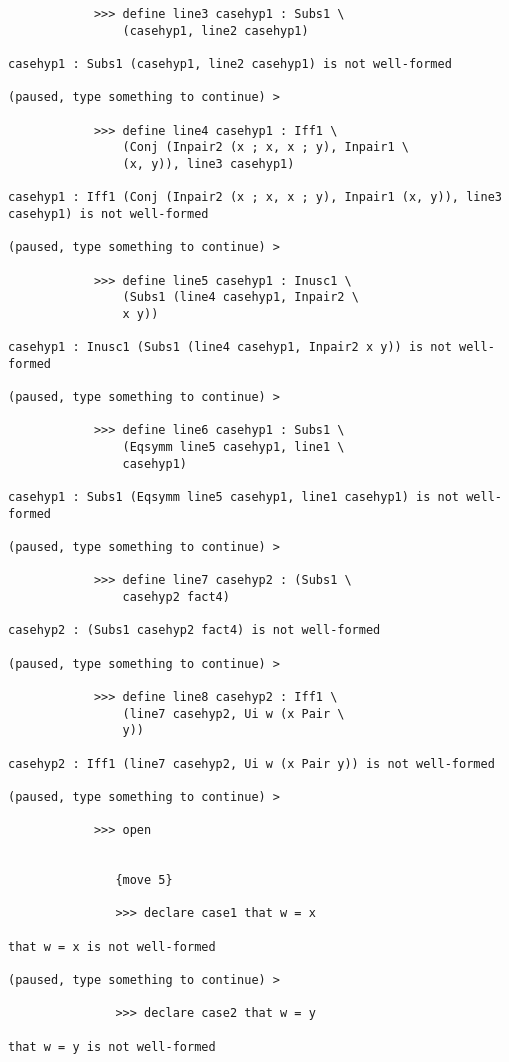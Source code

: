 \documentclass[12pt]{article}
\begin{document}
\begin{verbatim}
            >>> define line3 casehyp1 : Subs1 \
                (casehyp1, line2 casehyp1)

casehyp1 : Subs1 (casehyp1, line2 casehyp1) is not well-formed

(paused, type something to continue) >

            >>> define line4 casehyp1 : Iff1 \
                (Conj (Inpair2 (x ; x, x ; y), Inpair1 \
                (x, y)), line3 casehyp1)

casehyp1 : Iff1 (Conj (Inpair2 (x ; x, x ; y), Inpair1 (x, y)), line3 casehyp1) is not well-formed

(paused, type something to continue) >

            >>> define line5 casehyp1 : Inusc1 \
                (Subs1 (line4 casehyp1, Inpair2 \
                x y))

casehyp1 : Inusc1 (Subs1 (line4 casehyp1, Inpair2 x y)) is not well-formed

(paused, type something to continue) >

            >>> define line6 casehyp1 : Subs1 \
                (Eqsymm line5 casehyp1, line1 \
                casehyp1)

casehyp1 : Subs1 (Eqsymm line5 casehyp1, line1 casehyp1) is not well-formed

(paused, type something to continue) >

            >>> define line7 casehyp2 : (Subs1 \
                casehyp2 fact4)

casehyp2 : (Subs1 casehyp2 fact4) is not well-formed

(paused, type something to continue) >

            >>> define line8 casehyp2 : Iff1 \
                (line7 casehyp2, Ui w (x Pair \
                y))

casehyp2 : Iff1 (line7 casehyp2, Ui w (x Pair y)) is not well-formed

(paused, type something to continue) >

            >>> open


               {move 5}

               >>> declare case1 that w = x

that w = x is not well-formed

(paused, type something to continue) >

               >>> declare case2 that w = y

that w = y is not well-formed


\end{verbatim}
\end{document}
